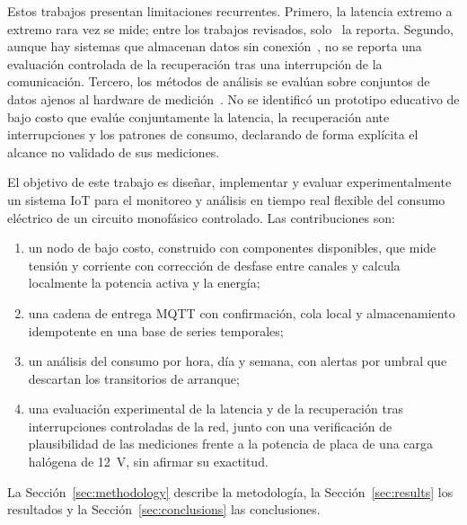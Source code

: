 Estos trabajos presentan limitaciones recurrentes.
Primero, la latencia extremo a extremo rara vez se mide; entre los trabajos revisados, solo~\cite{desousa2026smartmeter} la reporta.
Segundo, aunque hay sistemas que almacenan datos sin conexión~\cite{kizonde2023monitoringnode}, no se reporta una evaluación controlada de la recuperación tras una interrupción de la comunicación.
Tercero, los métodos de análisis se evalúan sobre conjuntos de datos ajenos al hardware de medición~\cite{oprea2021anomaly,zheng2023thresholds}.
No se identificó un prototipo educativo de bajo costo que evalúe conjuntamente la latencia, la recuperación ante interrupciones y los patrones de consumo, declarando de forma explícita el alcance no validado de sus mediciones.

El objetivo de este trabajo es diseñar, implementar y evaluar experimentalmente un sistema IoT para el monitoreo y análisis en tiempo real flexible del consumo eléctrico de un circuito monofásico controlado.
Las contribuciones son:
\begin{enumerate}
  \item un nodo de bajo costo, construido con componentes disponibles, que mide tensión y corriente con corrección de desfase entre canales y calcula localmente la potencia activa y la energía;
  \item una cadena de entrega MQTT con confirmación, cola local y almacenamiento idempotente en una base de series temporales;
  \item un análisis del consumo por hora, día y semana, con alertas por umbral que descartan los transitorios de arranque;
  \item una evaluación experimental de la latencia y de la recuperación tras interrupciones controladas de la red, junto con una verificación de plausibilidad de las mediciones frente a la potencia de placa de una carga halógena de \SI{12}{V}, sin afirmar su exactitud.
\end{enumerate}
La Sección~\ref{sec:methodology} describe la metodología, la Sección~\ref{sec:results} los resultados y la Sección~\ref{sec:conclusions} las conclusiones.
